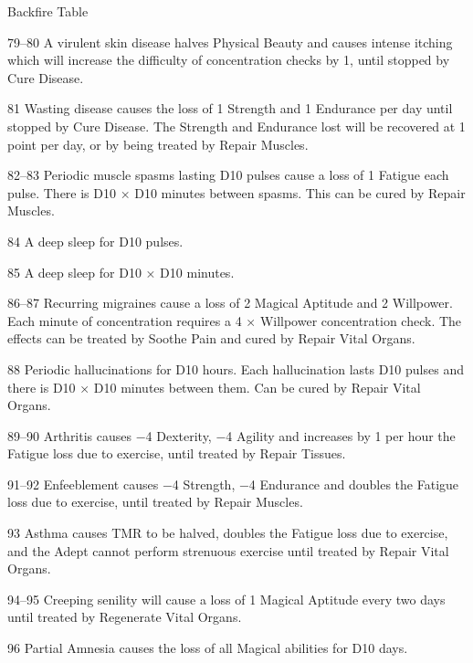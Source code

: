 \begin{Chapter}{Backfire Table}
\begin{Description}
\item[79--80] A virulent skin disease halves Physical Beauty and
  causes intense itching which will increase the difficulty of
  concentration checks by 1, until stopped by Cure Disease.

\item[81] Wasting disease causes the loss of 1 Strength and 1
  Endurance per day until stopped by Cure Disease. The Strength and
  Endurance lost will be recovered at 1 point per day, or by being
  treated by Repair Muscles.

\item[82--83] Periodic muscle spasms lasting D10 pulses cause a loss of
  1 Fatigue each pulse. There is D10 × D10 minutes between
  spasms. This can be cured by Repair Muscles.

\item[84] A deep sleep for D10 pulses.


\item[85] A deep sleep for D10 × D10 minutes.

\item[86--87] Recurring migraines cause a loss of 2 Magical Aptitude
  and 2 Willpower. Each minute of concentration requires a 4 ×
  Willpower concentration check. The effects can be treated by Soothe
  Pain and cured by Repair Vital Organs.

\item[88] Periodic hallucinations for D10 hours.  Each hallucination
  lasts D10 pulses and there is D10 × D10 minutes between them. Can be
  cured by Repair Vital Organs.


\item[89--90] Arthritis causes −4 Dexterity, −4 Agility and increases
  by 1 per hour the Fatigue loss due to exercise, until treated by
  Repair Tissues.

\item[91--92] Enfeeblement causes −4 Strength, −4 Endurance and doubles
  the Fatigue loss due to exercise, until treated by Repair Muscles.

\item[93] Asthma causes TMR to be halved, doubles the Fatigue loss due
  to exercise, and the Adept cannot perform strenuous exercise until
  treated by Repair Vital Organs.

\item[94--95] Creeping senility will cause a loss of 1 Magical Aptitude
  every two days until treated by Regenerate Vital Organs.

\item[96] Partial Amnesia causes the loss of all Magical abilities for
  D10 days.


\end{Description}
\end{Chapter}
